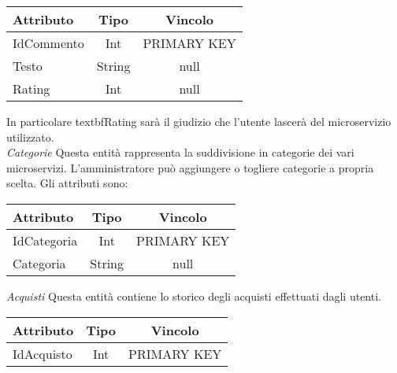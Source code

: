 {{			\begin{center}
			\renewcommand\arraystretch{1.2} \begin{tabular}{lcc}
				\textbf{Attributo}&\textbf{Tipo}&\textbf{Vincolo}\\ \hline
				IdCommento&Int&PRIMARY KEY\\
				Testo&String&null \\
				Rating&Int&null \\
			\end{tabular}
			\end{center}
			In particolare textbf{Rating} sarà il giudizio che l'utente lascerà del microservizio utilizzato. \\
			
			\textit{Categorie}
			Questa entità rappresenta la suddivisione in categorie dei vari microservizi. L'amministratore può aggiungere o togliere categorie a propria scelta. Gli attributi sono: 
			\begin{center}
			\renewcommand\arraystretch{1.2} \begin{tabular}{lcc}
				\textbf{Attributo}&\textbf{Tipo}&\textbf{Vincolo}\\ \hline
				IdCategoria&Int&PRIMARY KEY\\
				Categoria&String&null \\			
			\end{tabular}
			\end{center}
			\textit{Acquisti}
			Questa entità contiene lo storico degli acquisti effettuati dagli utenti.
			\begin{center}
			\renewcommand\arraystretch{1.2} \begin{tabular}{lcc}
				\textbf{Attributo}&\textbf{Tipo}&\textbf{Vincolo}\\ \hline
				IdAcquisto&Int&PRIMARY KEY\\
			\end{tabular}
			\end{center}
}}
